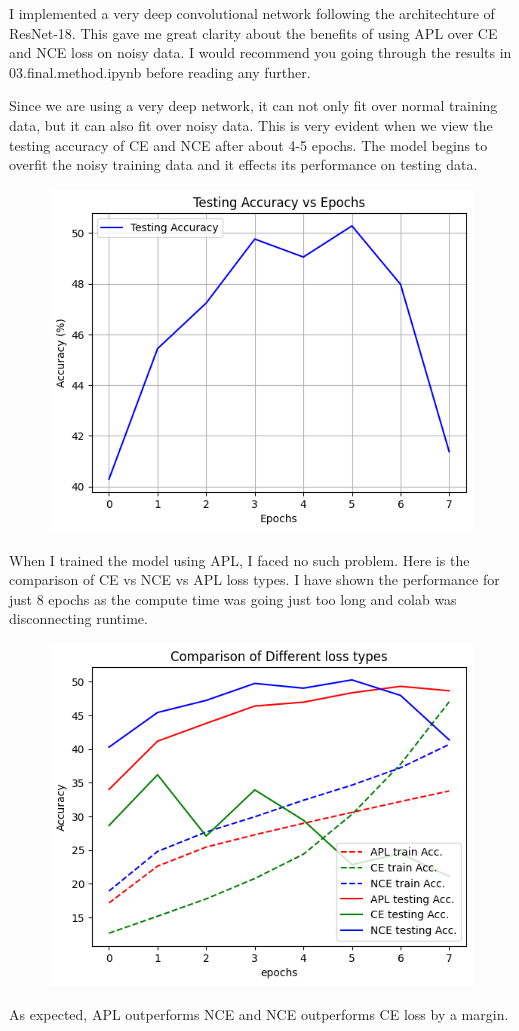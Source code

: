 \documentclass{article}
\begin{document}
I implemented a very deep convolutional network following the architechture of ResNet-18. This gave me great clarity about the benefits of using APL over CE and NCE loss on noisy data. I would recommend you going through the results in 03.final.method.ipynb before reading any further.

Since we are using a very deep network, it can not only fit over normal training data, but it can also fit over noisy data. This is very evident when we view the testing accuracy of CE and NCE after about 4-5 epochs. The model begins to overfit the noisy training data and it effects its performance on testing data. 

\begin{figure}[htbp]
    \centering
    \includegraphics[width=0.7\linewidth]{nce_loss_resnet.png}  %
    \label{fig:your-label}
\end{figure}

When I trained the model using APL, I faced no such problem. Here is the comparison of CE vs NCE vs APL loss types. I have shown the performance for just 8 epochs as the compute time was going just too long and colab was disconnecting runtime.
\FloatBarrier
\begin{figure}[htbp]
    \centering
    \includegraphics[width=0.7\linewidth]{comparison.png}  %
    \label{fig:your-label}
\end{figure}
\FloatBarrier

As expected, APL outperforms NCE and NCE outperforms CE loss by a margin.
\end{document}
